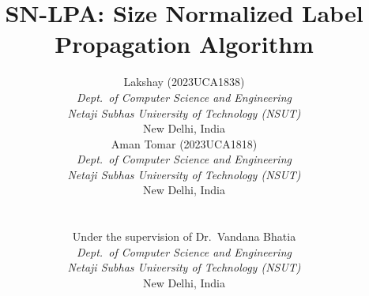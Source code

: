 \documentclass[conference]{IEEEtran}
\begin{document}
\title{SN-LPA: Size Normalized Label Propagation Algorithm}

\author{%
\begin{tabular}[t]{c}
Lakshay (2023UCA1838)\\[0.5ex]
{\small\textit{Dept.\ of Computer Science and Engineering}}\\
{\small\textit{Netaji Subhas University of Technology (NSUT)}}\\
{\small New Delhi, India}
\end{tabular}%
\hspace{2.2cm}%
\begin{tabular}[t]{c}
Aman Tomar (2023UCA1818)\\[0.5ex]
{\small\textit{Dept.\ of Computer Science and Engineering}}\\
{\small\textit{Netaji Subhas University of Technology (NSUT)}}\\
{\small New Delhi, India}
\end{tabular}\\[3ex]
\begin{tabular}[t]{c}
Under the supervision of Dr.\ Vandana Bhatia\\[0.5ex]
{\small\textit{Dept.\ of Computer Science and Engineering}}\\
{\small\textit{Netaji Subhas University of Technology (NSUT)}}\\
{\small New Delhi, India}
\end{tabular}
}

\maketitle
\end{document}
